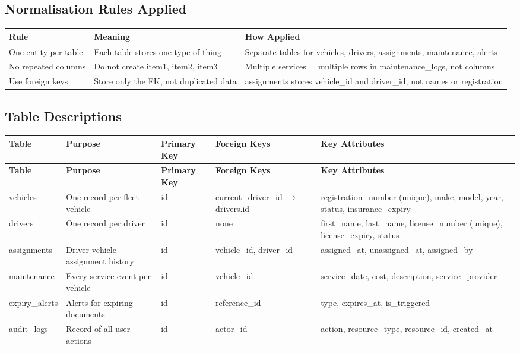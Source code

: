 \documentclass[11pt,a4paper]{article}
\begin{document}
\subsection{Normalisation Rules Applied}

\begin{table}[H]
\centering
\begin{tabularx}{\textwidth}{|p{3.5cm}|p{5cm}|p{5cm}|}
\hline
\textbf{Rule} & \textbf{Meaning} & \textbf{How Applied} \\
\hline
One entity per table & Each table stores one type of thing & Separate tables for vehicles, drivers, assignments, maintenance, alerts \\
\hline
No repeated columns & Do not create item1, item2, item3 & Multiple services = multiple rows in maintenance\_logs, not columns \\
\hline
Use foreign keys & Store only the FK, not duplicated data & assignments stores vehicle\_id and driver\_id, not names or registration \\
\hline
\end{tabularx}
\end{table}

\subsection{Table Descriptions}

\begin{longtable}{|p{2.5cm}|p{3cm}|p{2cm}|p{2.5cm}|p{3.5cm}|}
\hline
\textbf{Table} & \textbf{Purpose} & \textbf{Primary Key} & \textbf{Foreign Keys} & \textbf{Key Attributes} \\
\hline
\endfirsthead
\hline
\textbf{Table} & \textbf{Purpose} & \textbf{Primary Key} & \textbf{Foreign Keys} & \textbf{Key Attributes} \\
\hline
\endhead
vehicles & One record per fleet vehicle & id & current\_driver\_id $\rightarrow$ drivers.id & registration\_number (unique), make, model, year, status, insurance\_expiry \\
\hline
drivers & One record per driver & id & none & first\_name, last\_name, license\_number (unique), license\_expiry, status \\
\hline
assignments & Driver-vehicle assignment history & id & vehicle\_id, driver\_id & assigned\_at, unassigned\_at, assigned\_by \\
\hline
maintenance & Every service event per vehicle & id & vehicle\_id & service\_date, cost, description, service\_provider \\
\hline
expiry\_alerts & Alerts for expiring documents & id & reference\_id & type, expires\_at, is\_triggered \\
\hline
audit\_logs & Record of all user actions & id & actor\_id & action, resource\_type, resource\_id, created\_at \\
\hline
\end{longtable}
\end{document}
